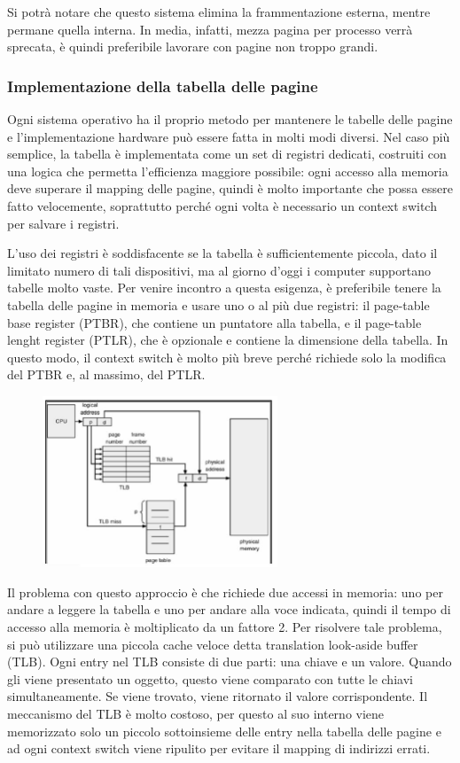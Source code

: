 \documentclass[a4paper]{article}
\begin{document}
Si potrà notare che questo sistema elimina la frammentazione esterna, mentre permane quella interna. In media, infatti, mezza pagina per processo verrà sprecata, è quindi preferibile lavorare con pagine non troppo grandi.

\subsubsection{Implementazione della tabella delle pagine}
Ogni sistema operativo ha il proprio metodo per mantenere le tabelle delle pagine e l'implementazione hardware può essere fatta in molti modi diversi. Nel caso più semplice, la tabella è implementata come un set di registri dedicati, costruiti con una logica che permetta l'efficienza maggiore possibile: ogni accesso alla memoria deve superare il mapping delle pagine, quindi è molto importante che possa essere fatto velocemente, soprattutto perché ogni volta è necessario un context switch per salvare i registri.

L'uso dei registri è soddisfacente se la tabella è sufficientemente piccola, dato il limitato numero di tali dispositivi, ma al giorno d'oggi i computer supportano tabelle molto vaste. Per venire incontro a questa esigenza, è preferibile tenere la tabella delle pagine in memoria e usare uno o al più due registri: il page-table base register (PTBR), che contiene un puntatore alla tabella, e il page-table lenght register (PTLR), che è opzionale e contiene la dimensione della tabella. In questo modo, il context switch è molto più breve perché richiede solo la modifica del PTBR e, al massimo, del PTLR.

\begin{figure}
   \includegraphics[width=7cm]{img/tlb.JPG}
\end{figure}
Il problema con questo approccio è che richiede due accessi in memoria: uno per andare a leggere la tabella e uno per andare alla voce indicata, quindi il tempo di accesso alla memoria è moltiplicato da un fattore 2. Per risolvere tale problema, si può utilizzare una piccola cache veloce detta translation look-aside buffer (TLB). Ogni entry nel TLB consiste di due parti: una chiave e un valore.  Quando gli viene presentato un oggetto, questo viene comparato con tutte le chiavi simultaneamente. Se viene trovato, viene ritornato il valore corrispondente.
Il meccanismo del TLB è molto costoso, per questo al suo interno viene memorizzato solo un piccolo sottoinsieme delle entry nella tabella delle pagine e ad ogni context switch viene ripulito per evitare il mapping di indirizzi errati.
\end{document}
